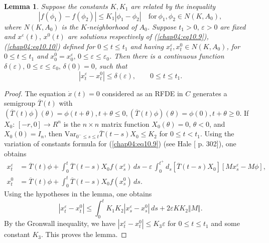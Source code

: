 \documentclass{surv-l}
\theoremstyle{plain}
\newtheorem{lemma}[theorem]{Lemma}
\theoremstyle{definition}
\numberwithin{equation}{section}
\numberwithin{figure}{chapter}
\begin{document}
\begin{lemma}\label{lem4.10.5} Suppose the constants $K, K_{1}$ are related by the inequality
\begin{equation*}
|f(\phi_{1})-f(\phi_{2})|\leq K_{1}|\phi_{1}-\phi_{2}|\quad \mathrm{for}\ \phi_{1}, \phi_{2}\in N(K, A_{0}),
\end{equation*}
where $N(K, A_{0})$ is the $K$-neighborhood of $A_{0}$. Suppose $t_{1}>0,\, \varepsilon >0$ are fixed and $x^{\varepsilon}(t),\, x^{0}(t)$ are solutions respectively of \emph{(\ref{chap04:eq10.9}), (\ref{chap04:eq10.10})} defined for $0\leq t\leq t_{1}$ and having $x_{t}^{\varepsilon}, x_{t}^{0}\in N(K, A_{0})$, for $0\leq t\leq t_{1}$ and $x_{0}^{0}=x_{0}^{\varepsilon},\, 0\leq\varepsilon \leq\varepsilon_{0}$. Then there is a continuous function $\delta(\varepsilon),\, 0\leq\varepsilon \leq\varepsilon_{0},\, \delta(0)=0$, such that
\begin{equation*}
|x_{t}^{\varepsilon}-x_{t}^{0}|\leq\delta(\varepsilon),\quad\quad 0\leq t\leq t_{1}.
\end{equation*}
\end{lemma}
\begin{proof} The equation $\dot{x}(t)=0$ considered as an RFDE in $C$ generates a semigroup $\overline{T}(t)$ with $(\overline{T}(t)\phi)(\theta)=\phi(t+\theta), t+\theta\leq 0, (\overline{T}(t)\phi)(\theta)=\phi(0), t+\theta\geq 0$. If $X_{0}{:}\,[-r, 0]\rightarrow R^{n}$ is the $n\times n$ matrix function $X_{0}(\theta)=0,\, \theta<0$, and $X_{0}(0)=I_{n}$, then $\mathrm{Var}_{0^{-}\leq s\leq t}\overline{T}(t-s)X_{0}\leq K_{2}$ for $0\leq t<t_{1}$. Using the variation of constants formula for (\ref{chap04:eq10.9}) (see Hale [\citeyear{1977h} p. 302]), one obtains
\begin{align*}
x_{t}^{\varepsilon}&=\overline{T}(t)\phi+\int_{0}^{t}\overline{T}(t-s)X_{0}f(x_{s}^{\varepsilon})\,ds-\varepsilon\,\int_{0}^{t^{+}}d_{s}[\overline{T}(t-s)X_{0}][Mx_{s}^{\varepsilon}-M\phi],\\
x_{t}^{0}&=\overline{T}(t)\phi+\int_{0}^{t}\overline{T}(t-s)X_{0}f(x_{s}^{0})\, ds.
\end{align*}
Using the hypotheses in the lemma, one obtains
\begin{equation*}
|x_{t}^{\varepsilon}-x_{t}^{0}|\leq\int_{0}^{t}K_{1}K_{2}|x_{s}^{\varepsilon}-x_{s}^{0}|\,ds+2\varepsilon KK_{2}\Vert M\Vert.
\end{equation*}
By the Gronwall inequality, we have $|x_{t}^{\varepsilon}-x_{t}^{0}|\leq K_{3}\varepsilon$ for $0\leq t\leq t_{1}$ and some constant $K_{3}$. This proves the lemma.
\end{proof}
\end{document}
